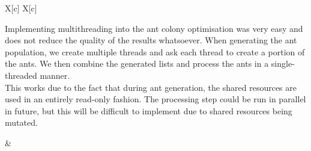 \documentclass[a4paper, 11pt,table]{article}
\begin{document}
	\begin{tabu}{X[c] X[c]}	
		\begin{minipage}{\linewidth}
			Implementing multithreading into the ant colony optimisation was very easy and does not reduce the quality of the results whatsoever. When generating the ant population, we create multiple threads and ask each thread to create a portion of the ants. We then combine the generated lists and process the ants in a single-threaded manner.\\
			
			This works due to the fact that during ant generation, the shared resources are used in an entirely read-only fashion. The processing step could be run in parallel in future, but this will be difficult to implement due to shared resources being mutated.
		\end{minipage}
		
		&
		\begin{minipage}{\linewidth}
		\end{minipage}
		\\
	\end{tabu}
	
	
\end{document}

